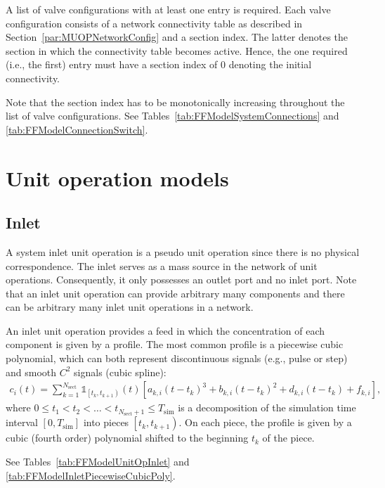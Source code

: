 A list of valve configurations with at least one entry is required.
Each valve configuration consists of a network connectivity table as described in Section~\ref{par:MUOPNetworkConfig} and a section index.
The latter denotes the section in which the connectivity table becomes active.
Hence, the one required (i.e., the first) entry must have a section index of $0$ denoting the initial connectivity.

Note that the section index has to be monotonically increasing throughout the list of valve configurations.
See Tables~\ref{tab:FFModelSystemConnections} and \ref{tab:FFModelConnectionSwitch}.

\section{Unit operation models}

\subsection{Inlet}\label{sec:MUOPInlet}

A system inlet unit operation  is a pseudo unit operation since there is no physical correspondence.
The inlet serves as a mass source in the network of unit operations.
Consequently, it only possesses an outlet port and no inlet port.
Note that an inlet unit operation can provide arbitrary many components and there can be arbitrary many inlet unit operations in a network.

An inlet unit operation provides a feed in which the concentration of each component is given by a profile.
The most common profile is a piecewise cubic polynomial, which can both represent discontinuous signals (e.g., pulse or step) and smooth $C^2$ signals (cubic spline):
\begin{align*}
	c_i(t) = \sum_{k = 1}^{N_{\text{sect}}} \mathds{1}_{\left[t_k, t_{k+1} \right)}(t) \left[ a_{k,i} \left( t - t_k \right)^3 + b_{k,i} \left( t - t_k \right)^2 + d_{k,i} \left( t - t_k \right) + f_{k,i} \right],
\end{align*}
where $0 \leq t_1 < t_2 < \dots < t_{N_{\text{sect}} + 1} \leq T_{\text{sim}}$ is a decomposition of the simulation time interval $\left[0, T_{\text{sim}}\right]$ into pieces $\left[t_k, t_{k+1} \right)$.
On each piece, the profile is given by a cubic (fourth order) polynomial shifted to the beginning $t_k$ of the piece.

See Tables~\ref{tab:FFModelUnitOpInlet} and \ref{tab:FFModelInletPiecewiseCubicPoly}.

